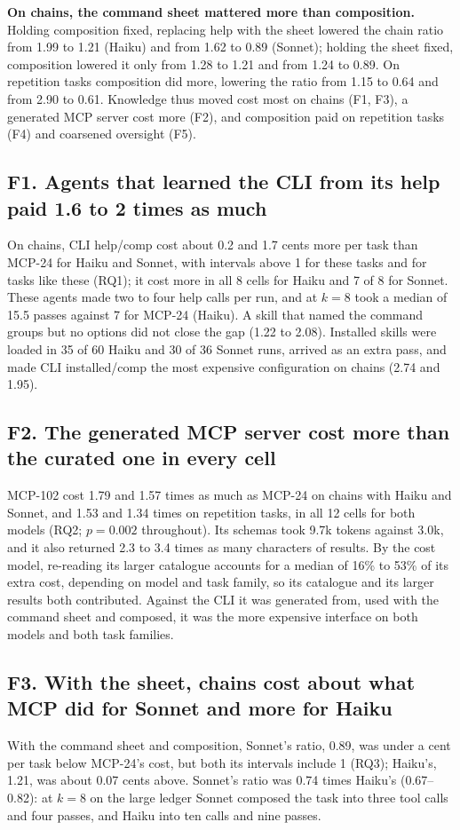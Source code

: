 \documentclass[sigconf,nonacm]{acmart}
\newcommand{\cfg}[1]{\textsf{#1}}
\newcommand{\finding}[1]{\textbf{#1}}
\begin{document}
\finding{On chains, the command sheet mattered more than composition.} Holding composition fixed, replacing help with the sheet lowered the chain ratio from 1.99 to 1.21 (Haiku) and from 1.62 to 0.89 (Sonnet); holding the sheet fixed, composition lowered it only from 1.28 to 1.21 and from 1.24 to 0.89. On repetition tasks composition did more, lowering the ratio from 1.15 to 0.64 and from 2.90 to 0.61. Knowledge thus moved cost most on chains (F1, F3), a generated MCP server cost more (F2), and composition paid on repetition tasks (F4) and coarsened oversight (F5).

\subsection{F1. Agents that learned the CLI from its help paid 1.6 to 2 times as much}
\label{sec:f1}
On chains, \cfg{CLI help/comp} cost about 0.2 and 1.7 cents more per task than \cfg{MCP-24} for Haiku and Sonnet, with intervals above 1 for these tasks and for tasks like these (RQ1); it cost more in all 8 cells for Haiku and 7 of 8 for Sonnet. These agents made two to four help calls per run, and at $k=8$ took a median of 15.5 passes against 7 for \cfg{MCP-24} (Haiku). A skill that named the command groups but no options did not close the gap (1.22 to 2.08). Installed skills were loaded in 35 of 60 Haiku and 30 of 36 Sonnet runs, arrived as an extra pass, and made \cfg{CLI installed/comp} the most expensive configuration on chains (2.74 and 1.95).

\subsection{F2. The generated MCP server cost more than the curated one in every cell}
\label{sec:f2}
\cfg{MCP-102} cost 1.79 and 1.57 times as much as \cfg{MCP-24} on chains with Haiku and Sonnet, and 1.53 and 1.34 times on repetition tasks, in all 12 cells for both models (RQ2; $p = 0.002$ throughout). Its schemas took 9.7k tokens against 3.0k, and it also returned 2.3 to 3.4 times as many characters of results. By the cost model, re-reading its larger catalogue accounts for a median of 16\% to 53\% of its extra cost, depending on model and task family, so its catalogue and its larger results both contributed. Against the CLI it was generated from, used with the command sheet and composed, it was the more expensive interface on both models and both task families.

\subsection{F3. With the sheet, chains cost about what MCP did for Sonnet and more for Haiku}
\label{sec:f3}
With the command sheet and composition, Sonnet's ratio, 0.89, was under a cent per task below \cfg{MCP-24}'s cost, but both its intervals include 1 (RQ3); Haiku's, 1.21, was about 0.07 cents above. Sonnet's ratio was 0.74 times Haiku's (0.67--0.82): at $k=8$ on the large ledger Sonnet composed the task into three tool calls and four passes, and Haiku into ten calls and nine passes.
\end{document}
